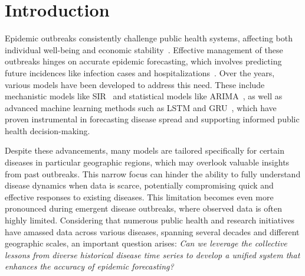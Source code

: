 \section{Introduction}
Epidemic outbreaks consistently challenge public health systems, affecting both individual well-being and economic stability~\cite{nicola2020socio}. Effective management of these outbreaks hinges on accurate epidemic forecasting, which involves predicting future incidences like infection cases and hospitalizations~\cite{liu2024review, wan2024epidemiology, adhikari2019epideep}. Over the years, various models have been developed to address this need. These include mechanistic models like SIR~\cite{cooper2020sir} and statistical models like ARIMA~\cite{sahai2020arima, kontopoulou2023review}, as well as advanced machine learning methods such as LSTM and GRU~\cite{shahid2020predictions}, which have proven instrumental in forecasting disease spread and supporting informed public health decision-making.



Despite these advancements, many models are tailored specifically for certain diseases in particular geographic regions, which may overlook valuable insights from past outbreaks. This narrow focus can hinder the ability to fully understand disease dynamics when data is scarce, potentially compromising quick and effective responses to existing diseases. This limitation becomes even more pronounced during emergent disease outbreaks, where observed data is often highly limited. Considering that numerous public health and research initiatives have amassed data across various diseases, spanning several decades and different geographic scales, an important question arises: 
\textit{Can we leverage the collective lessons from diverse historical disease time series to develop a unified system that enhances the accuracy of epidemic forecasting?}

